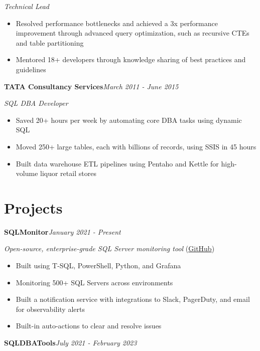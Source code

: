 \documentclass[10pt,a4paper]{article}
\begin{document}
\textit{Technical Lead}\\[-5pt]
\begin{itemize}
  \item Resolved performance bottlenecks and achieved a 3x performance improvement through advanced query optimization, such as recursive CTEs and table partitioning
  \item Mentored 18+ developers through knowledge sharing of best practices and guidelines
\end{itemize}
\vspace{14.7pt}
\noindent\textbf{TATA Consultancy Services}\hfill \textit{March 2011 - June 2015}

\textit{SQL DBA Developer}\\[-5pt]
\begin{itemize}
  \item Saved 20+ hours per week by automating core DBA tasks using dynamic SQL
  \item Moved 250+ large tables, each with billions of records, using SSIS in 45 hours
  \item Built data warehouse ETL pipelines using Pentaho and Kettle for high-volume liquor retail stores
\end{itemize}

\section{Projects}

\noindent\textbf{SQLMonitor}\hfill \textit{January 2021 - Present}

\textit{Open-source, enterprise-grade SQL Server monitoring tool} (\href{https://github.com/imajaydwivedi/SQLMonitor}{GitHub})
\begin{itemize}
  \item Built using T-SQL, PowerShell, Python, and Grafana
  \item Monitoring 500+ SQL Servers across environments
  \item Built a notification service with integrations to Slack, PagerDuty, and email for observability alerts
  \item Built-in auto-actions to clear and resolve issues
\end{itemize}
\vspace{14.7pt}
\noindent\textbf{SQLDBATools}\hfill \textit{July 2021 - February 2023}
\end{document}
